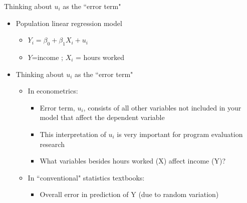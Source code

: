 \begin{frame}{Thinking about $u_{i}$ as the ``error term"}
	\begin{itemize}
	\item Population linear regression model
		\begin{itemize}
		\item $Y_{i} = \beta_{0} + \beta_{1}X_{i} + u_{i}$
		\item $Y$=income ; $X_{i}$ = hours worked
		\end{itemize}
	\item Thinking about $u_{i}$ as the ``error term"
		\begin{itemize}
		\item In econometrics:
			\begin{itemize}
			\item Error term, $u_{i}$, consists of all other variables not included in your model that affect the dependent variable
			\item This interpretation of $u_{i}$ is very important for program evaluation research
			\item What variables besides hours worked (X) affect income (Y)?
			\end{itemize}
		\item In ``conventional" statistics textbooks:
			\begin{itemize}
			\item Overall error in prediction of Y (due to random variation)
			\end{itemize}
		\end{itemize}
	\end{itemize}
\end{frame}


